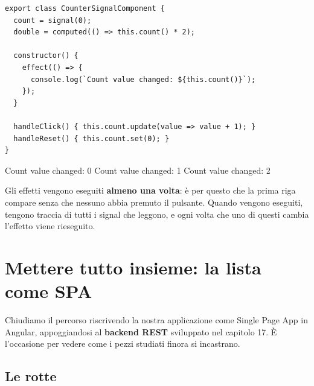 \begin{affianco}[0.56][c]
\codicepiccolo
\begin{lstlisting}[style=ts, name=counter-signal.component.ts]
export class CounterSignalComponent {
  count = signal(0);
  double = computed(() => this.count() * 2);

  constructor() {
    effect(() => {
      console.log(`Count value changed: ${this.count()}`);
    });
  }

  handleClick() { this.count.update(value => value + 1); }
  handleReset() { this.count.set(0); }
}
\end{lstlisting}
\risultato
\begin{immagine}
\end{immagine}
\begin{console}
Count value changed: 0
Count value changed: 1
Count value changed: 2
\end{console}
\end{affianco}

Gli effetti vengono eseguiti \textbf{almeno una volta}: è per questo che la
prima riga compare senza che nessuno abbia premuto il pulsante. Quando vengono
eseguiti, tengono traccia di tutti i signal che leggono, e ogni volta che uno di
questi cambia l'effetto viene rieseguito.

\section{Mettere tutto insieme: la lista come SPA}

Chiudiamo il percorso riscrivendo la nostra applicazione come Single Page App in
Angular, appoggiandosi al \textbf{backend REST} sviluppato nel capitolo 17. È
l'occasione per vedere come i pezzi studiati finora si incastrano.

\subsection{Le rotte}

